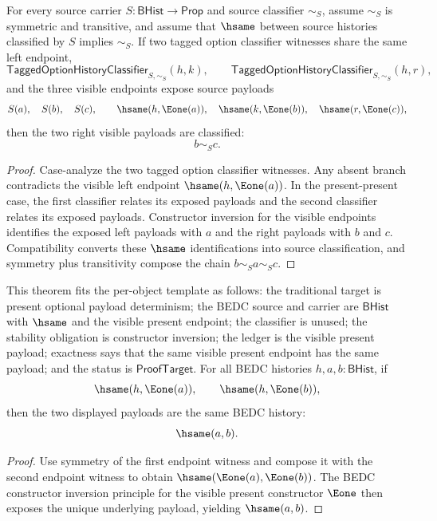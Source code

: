 \begin{theorem}
\label{thm:tagged-option-history-classifier-common-left-visible-payload-classification}
For every source carrier $S:\mathsf{BHist}\to\mathsf{Prop}$ and source
classifier $\sim_S$, assume $\sim_S$ is symmetric and transitive, and assume
that $\hsame$ between source histories classified by $S$ implies $\sim_S$.
If two tagged option classifier witnesses share the same left endpoint,
$$
\mathsf{TaggedOptionHistoryClassifier}_{S,\sim_S}(h,k),
\qquad
\mathsf{TaggedOptionHistoryClassifier}_{S,\sim_S}(h,r),
$$
and the three visible endpoints expose source payloads
$$
S(a),\quad S(b),\quad S(c),\qquad
\hsame(h,\Eone(a)),\quad
\hsame(k,\Eone(b)),\quad
\hsame(r,\Eone(c)),
$$
then the two right visible payloads are classified:
$$
b\sim_S c.
$$
\end{theorem}
\begin{proof}
Case-analyze the two tagged option classifier witnesses. Any absent branch
contradicts the visible left endpoint $\hsame(h,\Eone(a))$. In the
present-present case, the first classifier relates its exposed payloads and
the second classifier relates its exposed payloads. Constructor inversion for
the visible endpoints identifies the exposed left payloads with $a$ and the
right payloads with $b$ and $c$. Compatibility converts these $\hsame$
identifications into source classification, and symmetry plus transitivity
compose the chain $b\sim_S a\sim_S c$.
\end{proof}

\begin{theorem}
\label{thm:tagged-option-history-present-payload-determinism}
This theorem fits the per-object template as follows: the traditional target is
present optional payload determinism; the BEDC source and carrier are
$\mathsf{BHist}$ with $\hsame$ and the visible present endpoint; the classifier
is unused; the stability obligation is constructor inversion; the ledger is the
visible present payload; exactness says that the same visible present endpoint
has the same payload; and the status is $\mathsf{ProofTarget}$. For all BEDC
histories $h,a,b:\mathsf{BHist}$, if
$$
\hsame(h,\Eone(a)),\qquad \hsame(h,\Eone(b)),
$$
then the two displayed payloads are the same BEDC history:
$$
\hsame(a,b).
$$
\end{theorem}
\begin{proof}
Use symmetry of the first endpoint witness and compose it with the second
endpoint witness to obtain $\hsame(\Eone(a),\Eone(b))$. The BEDC constructor
inversion principle for the visible present constructor $\Eone$ then exposes
the unique underlying payload, yielding $\hsame(a,b)$.
\end{proof}

